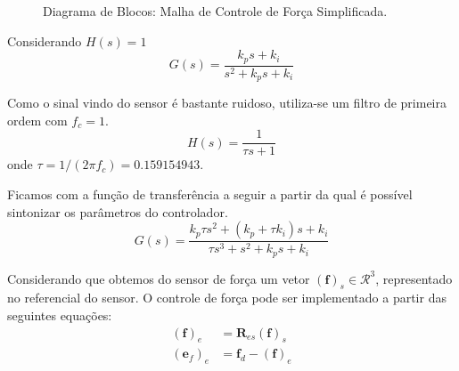 \begin{figure}[h!]
\centering
{}
\caption{Diagrama de Blocos: Malha de Controle de Força Simplificada.}
\label{fig:controle_forca_simples}
\end{figure}

Considerando $H(s) = 1$
\begin{equation}
G(s) = \frac{k_p s + k_i}{s^2 + k_p s + k_i}
\end{equation}

Como o sinal vindo do sensor é bastante ruidoso, utiliza-se um filtro de primeira ordem com $f_c = 1$.
\begin{equation}
H(s) = \frac{1}{\tau s + 1}
\end{equation}
onde $\tau = 1/(2 \pi f_c) = 0.159154943$.

Ficamos com a função de transferência a seguir a partir da qual é possível sintonizar os parâmetros do controlador.
\begin{equation}
G(s) = \frac{k_p \tau s^2 + (k_p + \tau k_i)s + k_i}{\tau s^3 + s^2 + k_p s + k_i}
\end{equation}

Considerando que obtemos do sensor de força um vetor $(\bm{f})_s \in \mathcal{R}^3$, representado no referencial do sensor. O controle de força pode ser implementado a partir das seguintes equações:
\begin{align}
(\bm{f})_e &= \bm{R}_{es} (\bm{f})_s \\
(\bm{e}_f)_e &= \bm{f}_d - (\bm{f})_e \\
\end{align}

